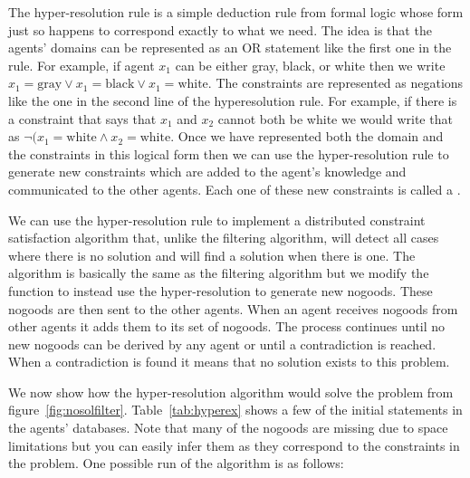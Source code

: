 The hyper-resolution rule is a simple deduction rule from formal logic
whose form just so happens to correspond exactly to what we need. The
idea is that the agents' domains can be represented as an OR statement
like the first one in the rule. For example, if agent $x_1$ can be
either gray, black, or white then we write $x_1 = \text{gray} \vee x_1
= \text{black} \vee x_1=\text{white}$. The constraints are represented
as negations like the one in the second line of the hyperesolution
rule. For example, if there is a constraint that says that $x_1$ and
$x_2$ cannot both be white we would write that as $\neg (x_1 =
\text{white} \wedge x_2 = \text{white}$.  Once we have represented
both the domain and the constraints in this logical form then we can
use the hyper-resolution rule to generate new constraints which are
added to the agent's knowledge and communicated to the other agents.
Each one of these new constraints is called a .

We can use the hyper-resolution rule to implement a distributed
constraint satisfaction algorithm that, unlike the filtering
algorithm, will detect all cases where there is no solution and will
find a solution when there is one. The algorithm is basically the same
as the filtering algorithm but we modify the  function to
instead use the hyper-resolution to generate new nogoods. These
nogoods are then sent to the other agents. When an agent receives
nogoods from other agents it adds them to its set of nogoods. The
process continues until no new nogoods can be derived by any agent or
until a contradiction is reached. When a contradiction is found it
means that no solution exists to this problem.

We now show how the hyper-resolution algorithm would solve the problem
from figure~\ref{fig:nosolfilter}. Table~\ref{tab:hyperex} shows a few
of the initial statements in the agents' databases. Note that many of
the nogoods are missing due to space limitations but you can easily
infer them as they correspond to the constraints in the problem. One
possible run of the algorithm is as follows:

